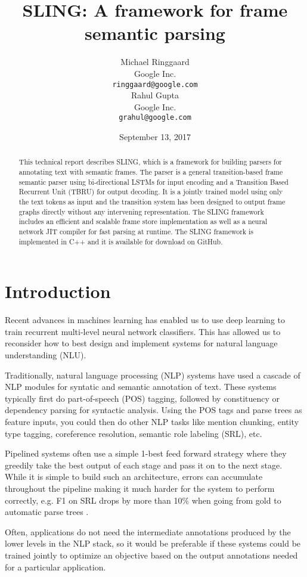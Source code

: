 \documentclass[11pt,a4paper]{article}
\title{SLING: A framework for frame semantic parsing}
\author{
Michael Ringgaard \\ Google Inc. \\ {\tt ringgaard@google.com} \\\And
Rahul Gupta \\ Google Inc. \\ {\tt grahul@google.com} \\
}
\date{September 13, 2017}
\begin{document}
\maketitle

\begin{abstract}
This technical report describes SLING, which is a framework for building
parsers for annotating text with semantic frames.
The parser is a general transition-based frame semantic parser using
bi-directional LSTMs for input encoding and a Transition Based Recurrent
Unit (TBRU) for output decoding.
It is a jointly trained model using only the text tokens as input and the
transition system has been designed to output frame graphs directly without
any intervening representation.
The SLING framework includes an efficient and scalable frame store
implementation as well as a neural network JIT compiler for fast parsing at
runtime.
The SLING framework is implemented in C++ and it is available for download
on GitHub.
\end{abstract}

\section{Introduction}

Recent advances in machines learning has enabled us to use deep learning to
train recurrent multi-level neural network classifiers. This has allowed us to
reconsider how to best design and implement systems for natural language
understanding (NLU).

Traditionally, natural language processing (NLP) systems have used a cascade of
NLP modules for syntatic and semantic annotation of text.
These systems typically first do part-of-speech (POS) tagging, followed by
constituency or dependency parsing for syntactic analysis.
Using the POS tags and parse trees as feature inputs, you could then do other
NLP tasks like mention chunking, entity type tagging, coreference resolution,
semantic role labeling (SRL), etc.

Pipelined systems often use a simple 1-best feed forward strategy \cite{finkel2006}
where they greedily take the best output of each stage and pass it on to the
next stage.
While it is simple to build such an architecture, errors can accumulate
throughout the pipeline making it much harder for the system to perform
correctly, e.g. F1 on SRL drops by more than 10\% when going from gold to
automatic parse trees \cite{toutanova2005}.

Often, applications do not need the intermediate annotations produced
by the lower levels in the NLP stack, so it would be preferable if these systems
could be trained jointly to optimize an objective based on the output
annotations needed for a particular application.
\end{document}
